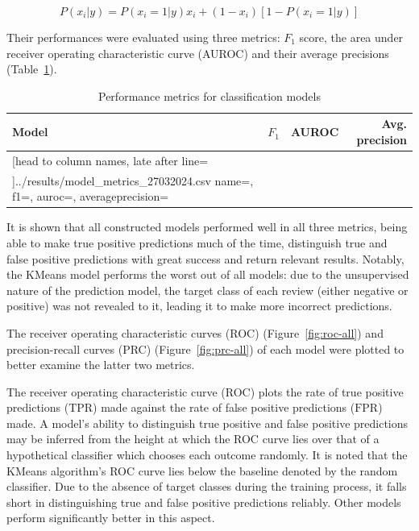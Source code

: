 \documentclass[11pt, a4paper]{pancake-article}
\begin{document}
\begin{equation}
  P\left(x_i|y \right) = P\left(x_i = 1 | y\right)x_i + \left(1 - x_i\right)\left[1 - P\left(x_i=1|y\right)\right]
  \label{eq:nb}
\end{equation}

Their performances were evaluated using three metrics: $F_1$ score, the area under receiver operating characteristic
curve (AUROC) and their average precisions (Table~\ref{tab:metrics}).

\begin{table}
	\centering
	\caption{Performance metrics for classification models}
	\label{tab:metrics}
	\begin{tabular}{lrrr}
		\toprule
		\textbf{Model} & $F_1$ & AUROC & Avg. precision \\
		\midrule
		\csvreader[head to column names, late after line=\\]{../results/model_metrics_27032024.csv}{
			name=\name,
			f1=\fone,
			auroc=\auroc,
			averageprecision=\avgprecision
		}{
		\name          & \fone       & \auroc         & \averageprecision
		}
		\bottomrule
	\end{tabular}
\end{table}

It is shown that all constructed models performed well in all three metrics, being
able to make true positive predictions much of the time, distinguish true and false
positive predictions with great success and return relevant results. Notably, the KMeans
model performs the worst out of all models: due to the unsupervised nature of the prediction
model, the target class of each review (either negative or positive) was not revealed to it,
leading it to make more incorrect predictions.

The receiver operating characteristic curves (ROC) (Figure~\ref{fig:roc-all}) and precision-recall curves (PRC)
(Figure~\ref{fig:prc-all}) of each model were plotted to better examine the latter two metrics.

The receiver operating characteristic curve (ROC) plots the rate of true positive predictions ($\text{TPR}$) made against the
rate of false positive predictions ($\text{FPR}$) made. A model's ability to distinguish
true positive and false positive predictions may be inferred from the height at which the ROC curve
lies over that of a hypothetical classifier which chooses each outcome randomly. It is noted that
the KMeans algorithm's ROC curve lies below the baseline denoted by the random classifier.
Due to the absence of target classes during the training process, it falls short in distinguishing
true and false positive predictions reliably. Other models perform significantly better in this aspect.
\end{document}
